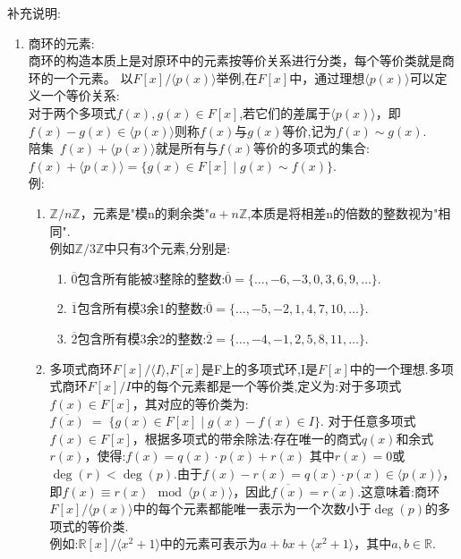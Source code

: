 \documentclass[oneside,openany]{ctexbook}
\begin{document}
补充说明:
\begin{enumerate}
  \item 商环的元素:\\
商环的构造本质上是对原环中的元素按等价关系进行分类，每个等价类就是商环的一个元素。
以$F[x]/\langle p(x)\rangle$举例,在$F[x]$中，通过理想$\langle p(x) \rangle$可以定义一个等价关系:\\
对于两个多项式$f(x), g(x) \in F[x]$,若它们的差属于$\langle p(x)\rangle$，即$f(x)-g(x) \in \langle p(x)\rangle$则称$f(x)$与$g(x)$等价,记为$f(x) \sim g(x)$.\\
陪集 $f(x)+ \langle p(x) \rangle$就是所有与$f(x)$等价的多项式的集合:$f(x)+\langle p(x) \rangle =\{ g(x) \in F[x] \mid g(x) \sim f(x) \}$.\\
例:
\begin{enumerate}
  \item $\mathbb{Z}/n\mathbb{Z}$，元素是"模n的剩余类"$a + n\mathbb{Z}$,本质是将相差n的倍数的整数视为"相同".\\
  例如$\mathbb{Z}/3\mathbb{Z}$中只有3个元素,分别是:
  \begin{enumerate}
    \item $\overline{0}$\>包含所有能被3整除的整数:$\overline{0}= \{ \dots, -6, -3, 0, 3, 6, 9, \dots \}$.
    \item $\overline{1}$\>包含所有模3余1的整数:$\overline{0}= \{ \dots, -5, -2, 1, 4, 7, 10, \dots \}$.
    \item $\overline{2}$\>包含所有模3余2的整数:$\overline{2}= \{ \dots, -4, -1, 2, 5, 8, 11, \dots \}$.
  \end{enumerate}

  \item 多项式商环$F[x]/\langle I\rangle$,$F[x]$是F上的多项式环,I是$F[x]$中的一个理想.多项式商环$F[x]/I$中的每个元素都是一个等价类,定义为:对于多项式$f(x) \in F[x]$，其对应的等价类为:$\overline{f(x)} \;=\; \{ g(x) \in F[x] \mid g(x) - f(x) \in I \}$.
  对于任意多项式$f(x) \in F[x]$，根据多项式的带余除法:存在唯一的商式$q(x)$和余式$r(x)$，使得:$f(x)=q(x) \cdot p(x)+r(x)$
  其中$r(x) = 0$或$\deg(r) < \deg(p)$.由于$f(x)-r(x)=q(x) \cdot p(x) \in \langle p(x) \rangle$，即$f(x) \equiv r(x) \mod \langle p(x) \rangle$，因此$\overline{f(x)}=\overline{r(x)}$.这意味着:商环$F[x]/\langle p(x) \rangle$中的每个元素都能唯一表示为一个次数小于$\deg(p)$的多项式的等价类.\\
  例如:$\mathbb{R}[x]/\langle x^2 + 1 \rangle$中的元素可表示为$a + bx + \langle x^2 + 1 \rangle$，其中$a, b \in \mathbb{R}$.
  \end{enumerate}
\end{enumerate}
\end{document}
